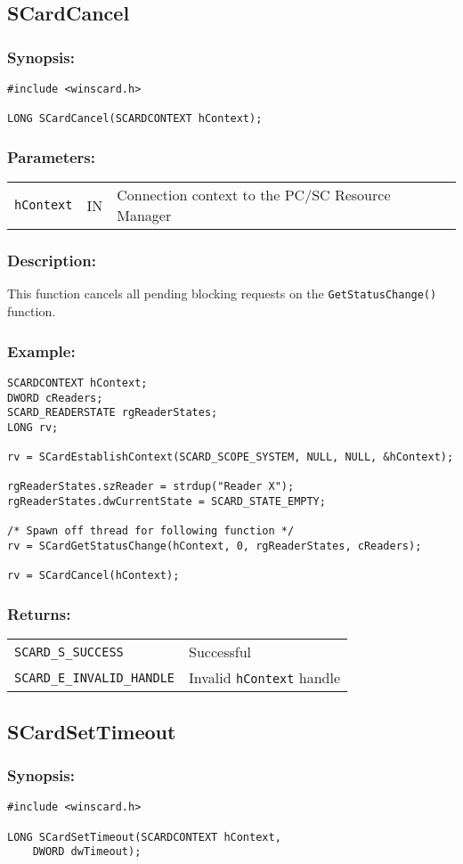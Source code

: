 \documentclass[a4paper,12pt]{article}
\newcommand{\synopsis}{\subsubsection{Synopsis:}}
\newcommand{\parameters}{\subsubsection{Parameters:}}
\newcommand{\desc}{\subsubsection{Description:}}
\newcommand{\example}{\subsubsection{Example:}}
\newcommand{\returns}{\subsubsection{Returns:}}
\begin{document}
\subsection{SCardCancel}

\synopsis

\begin{verbatim}
#include <winscard.h>

LONG SCardCancel(SCARDCONTEXT hContext);
\end{verbatim}

\parameters

\begin{tabular}{lll}
\texttt{hContext} &	IN &	Connection context to the PC/SC Resource Manager\\
\end{tabular}

\desc

This function cancels all pending blocking requests on the
\texttt{GetStatusChange()} function.

\example
\begin{verbatim}
SCARDCONTEXT hContext;
DWORD cReaders;
SCARD_READERSTATE rgReaderStates;
LONG rv;

rv = SCardEstablishContext(SCARD_SCOPE_SYSTEM, NULL, NULL, &hContext);

rgReaderStates.szReader = strdup("Reader X");
rgReaderStates.dwCurrentState = SCARD_STATE_EMPTY;

/* Spawn off thread for following function */
rv = SCardGetStatusChange(hContext, 0, rgReaderStates, cReaders);

rv = SCardCancel(hContext);
\end{verbatim}

\returns

\begin{tabular}{ll}
\texttt{SCARD\_S\_SUCCESS}			& Successful\\
\texttt{SCARD\_E\_INVALID\_HANDLE}		& Invalid \texttt{hContext} handle\\
\end{tabular}


\subsection{SCardSetTimeout}

\synopsis

\begin{verbatim}
#include <winscard.h>

LONG SCardSetTimeout(SCARDCONTEXT hContext,
    DWORD dwTimeout);
\end{verbatim}
\end{document}

